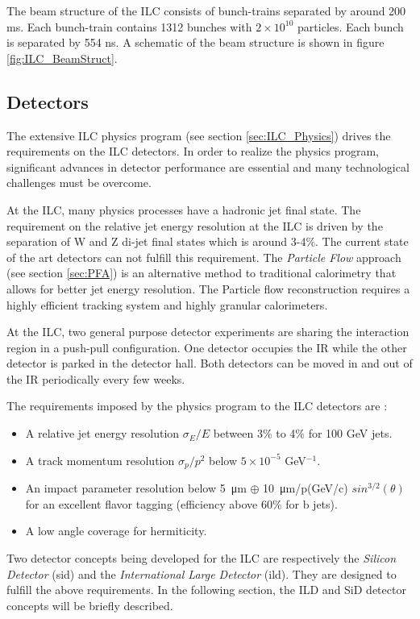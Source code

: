 The beam structure of the ILC consists of bunch-trains separated by around 200 ms. Each bunch-train contains 1312 bunches with $2 \times 10^{10}$ particles. Each bunch is separated by 554 ns. A schematic of the beam structure is shown in figure \ref{fig:ILC_BeamStruct}.

\subsection{Detectors}

The extensive ILC physics program (see section \ref{sec:ILC_Physics}) drives the requirements on the ILC detectors. In order to realize the physics program, significant advances in detector performance are essential and many technological challenges must be overcome.

At the ILC, many physics processes have a hadronic jet final state. The requirement on the relative jet energy resolution at the ILC is driven by the separation of W and Z di-jet final states which is around 3-4\%. The current state of the art detectors can not fulfill this requirement. The \textit{Particle Flow} approach (see section \ref{sec:PFA}) is an alternative method to traditional calorimetry that allows for better jet energy resolution. The Particle flow reconstruction requires a highly efficient tracking system and highly granular calorimeters.

At the ILC, two general purpose detector experiments are sharing the interaction region in a push-pull configuration. One detector occupies the IR while the other detector is parked in the detector hall. Both detectors can be moved in and out of the IR periodically every few weeks.

The requirements imposed by the physics program to the ILC detectors are \cite{ILC_TDR_Vol4}:
\begin{itemize}
  \item A relative jet energy resolution $\sigma_{E}/E$ between 3\% to 4\% for 100 GeV jets.
  \item A track momentum resolution $\sigma_{p}/p^2$ below $5 \times 10^{-5}$ GeV$^{-1}$.
  \item An impact parameter resolution below \SI{5}{\micro\meter} $\oplus$ \SI{10}{\micro\meter}/p(GeV/c) $sin^{3/2}(\theta)$ for an excellent flavor tagging (efficiency above 60\% for b jets).
  \item A low angle coverage for hermiticity.
\end{itemize}

Two detector concepts being developed for the ILC are respectively the \textit{Silicon Detector} (\acrshort{sid}) and the \textit{International Large Detector} (\acrshort{ild}). They are designed to fulfill the above requirements. In the following section, the ILD and SiD detector concepts will be briefly described.

